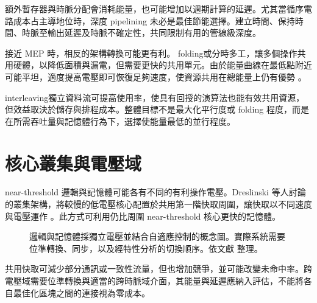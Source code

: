 額外暫存器與時脈分配會消耗能量，也可能增加以週期計算的延遲。尤其當循序電路成本占主導地位時，深度 pipelining 未必是最佳節能選擇。建立時間、保持時間、時脈至輸出延遲及時脈不確定性，共同限制有用的管線級深度。

接近 MEP 時，相反的架構轉換可能更有利。 folding或分時多工，讓多個操作共用硬體，以降低面積與漏電，但需要更快的共用單元。由於能量曲線在最低點附近可能平坦，適度提高電壓即可恢復足夠速度，使資源共用在總能量上仍有優勢 \cite[Sec.~VI]{markovic2010}。

 interleaving獨立資料流可提高使用率，使具有回授的演算法也能有效共用資源，但效益取決於儲存與排程成本。整體目標不是最大化平行度或 folding 程度，而是在所需吞吐量與記憶體行為下，選擇使能量最低的並行程度。

\section{核心叢集與電壓域}
 near-threshold 邏輯與記憶體可能各有不同的有利操作電壓。Dreslinski 等人討論的叢集架構，將較慢的低電壓核心配置於共用第一階快取周圍，讓快取以不同速度與電壓運作 \cite[Sec.~V-A]{dreslinski2010}。此方式可利用仍比周圍 near-threshold 核心更快的記憶體。

\begin{figure}[htbp]
\centering
{}
\caption{邏輯與記憶體採獨立電壓並結合自適應控制的概念圖。實際系統需要位準轉換、同步，以及經特性分析的切換順序。依文獻 \cite{dreslinski2010,udvs2010} 整理。}
\end{figure}

共用快取可減少部分通訊或一致性流量，但也增加競爭，並可能改變未命中率。跨電壓域需要位準轉換與適當的跨時脈域介面，其能量與延遲應納入評估，不能將各自最佳化區塊之間的連接視為零成本。

